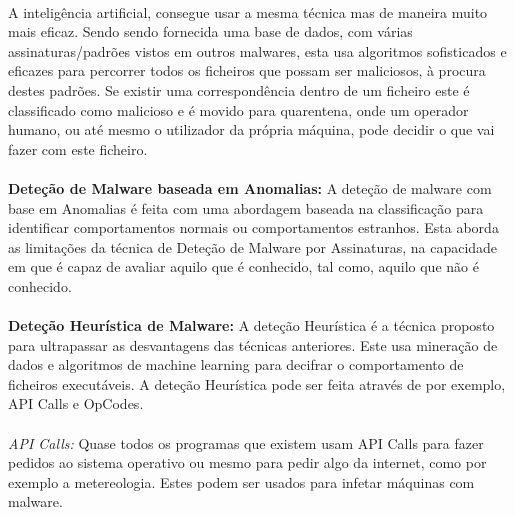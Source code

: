 \documentclass[11pt]{article}
\begin{document}
\paragraph{}
A inteligência artificial, consegue usar a mesma técnica mas de maneira muito mais eficaz. Sendo sendo fornecida uma base de dados, com várias assinaturas/padrões vistos em outros malwares, esta usa algoritmos sofisticados e eficazes para percorrer todos os ficheiros que possam ser maliciosos, à procura destes padrões. Se existir uma correspondência dentro de um ficheiro este é classificado como malicioso e é movido para quarentena, onde um operador humano, ou até mesmo o utilizador da própria máquina, pode decidir o que vai fazer com este ficheiro.\cite{1}\cite{8}\cite{3}

\paragraph{}

\textbf{Deteção de Malware baseada em Anomalias:}
A deteção de malware com base em Anomalias é feita com uma abordagem baseada na classificação para identificar comportamentos normais ou comportamentos estranhos. Esta aborda as limitações da técnica de Deteção de Malware por Assinaturas, na capacidade em que é capaz de avaliar aquilo que é conhecido, tal como, aquilo que não é conhecido.\cite{17}\cite{1}

\paragraph{}

\textbf{Deteção Heurística de Malware:}
A deteção Heurística é a técnica proposto para ultrapassar as desvantagens das técnicas anteriores. Este usa mineração de dados e algoritmos de machine learning para decifrar o comportamento de ficheiros executáveis. A deteção Heurística pode ser feita através de por exemplo, API Calls e OpCodes.
\paragraph{}

\textit{API Calls:}
Quase todos os programas que existem usam API Calls para fazer pedidos ao sistema operativo ou mesmo para pedir algo da internet, como por exemplo a metereologia. Estes podem ser usados para infetar máquinas com malware.

\paragraph{}
\end{document}
